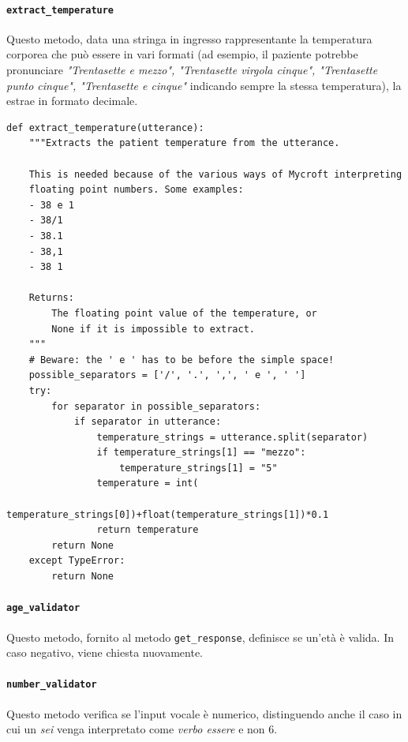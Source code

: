 \paragraph{\texttt{extract\_temperature}} Questo metodo, data una stringa in ingresso rappresentante la temperatura corporea che può essere in vari formati (ad esempio, il paziente potrebbe pronunciare \textit{"Trentasette e mezzo", "Trentasette virgola cinque", "Trentasette punto cinque", "Trentasette e cinque"} indicando sempre la stessa temperatura), la estrae in formato decimale.
\begin{verbatim}
def extract_temperature(utterance):
    """Extracts the patient temperature from the utterance.

    This is needed because of the various ways of Mycroft interpreting
    floating point numbers. Some examples:
    - 38 e 1
    - 38/1
    - 38.1
    - 38,1
    - 38 1

    Returns:
        The floating point value of the temperature, or
        None if it is impossible to extract.
    """
    # Beware: the ' e ' has to be before the simple space!
    possible_separators = ['/', '.', ',', ' e ', ' ']
    try:
        for separator in possible_separators:
            if separator in utterance:
                temperature_strings = utterance.split(separator)
                if temperature_strings[1] == "mezzo":
                    temperature_strings[1] = "5"
                temperature = int(
                    temperature_strings[0])+float(temperature_strings[1])*0.1
                return temperature
        return None
    except TypeError:
        return None
\end{verbatim}
\paragraph{\texttt{age\_validator}} Questo metodo, fornito al metodo \texttt{get\_response}, definisce se un'età è valida. In caso negativo, viene chiesta nuovamente.
\paragraph{\texttt{number\_validator}} Questo metodo verifica se l'input vocale è numerico, distinguendo anche il caso in cui un \textit{sei} venga interpretato come \textit{verbo essere} e non $6$.
